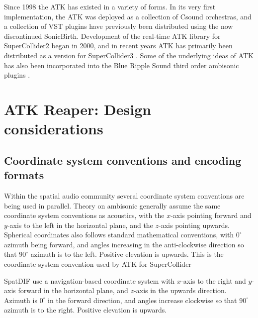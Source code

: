 \documentclass{article}
\begin{document}
Since 1998 the ATK has existed in a variety of forms.
In its very first implementation, the ATK was deployed as a collection of Csound orchestras, and a collection of VST plugins have previously been distributed using the now discontinued SonicBirth.
Development of the real-time ATK library for SuperCollider2 began in 2000, and in recent years ATK has primarily been distributed as a version for SuperCollider3 \cite{Anderson:2009introducingATK}.
Some of the underlying ideas of ATK has also been incorporated into the Blue Ripple Sound third order ambisonic plugins \cite{blueripple:2014TOA}.




\section{ATK Reaper: Design considerations}

\subsection{Coordinate system conventions and encoding formats}

Within the spatial audio community several coordinate system conventions are being used in parallel.
Theory on ambisonic generally assume the same coordinate system conventions as acoustics, with the $x$-axis pointing forward and $y$-axis to the left in the horizontal plane, and the $z$-axis pointing upwards. 
Spherical coordinates also follows standard mathematical conventions, with $0^{\circ}$ azimuth being forward, and angles increasing in the anti-clockwise direction so that $90^{\circ}$ azimuth is to the left.
Positive elevation is upwards.
This is the coordinate system convention used by ATK for SuperCollider


SpatDIF use a navigation-based coordinate system with $x$-axis to the right and $y$-axis forward in the horizontal plane, and $z$-axis in the upwards direction.
Azimuth is $0^{\circ}$ in the forward direction, and angles increase clockwise so that $90^{\circ}$ azimuth is to the right.
Positive elevation is upwards.
\end{document}
